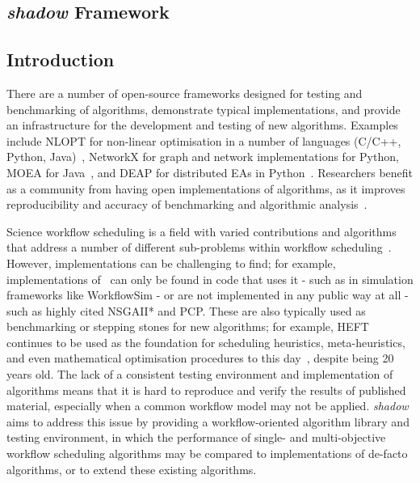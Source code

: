 \documentclass{article}
\begin{document}
\begin{multicols}{2}
\section*{\textit{shadow} Framework}
\label{sec:title}

\subsection*{Introduction}
\label{ssec:subtitle}
There are a number of open-source frameworks designed for testing and benchmarking of algorithms, demonstrate typical implementations, and provide
an infrastructure for the development and testing of new algorithms. Examples include NLOPT for non-linear optimisation in a number of languages (C/C++, Python, Java)~\cite{johnson}, NetworkX for graph and network implementations for Python, MOEA for Java~\cite{2020}, and DEAP for distributed EAs in Python~\cite{derainville2012}. Researchers benefit as a community from having open implementations of algorithms, as it improves reproducibility and accuracy of benchmarking and algorithmic analysis~\cite{crick2014}. 


Science workflow scheduling is a field with varied contributions and algorithms that address a number of different sub-problems
within workflow scheduling~\cite{wu2015a,zotero-661,benoit2013,herroelen1998,rodriguez2016,burkimsher}. However, implementations can be challenging to find; for example, implementations of~\cite{topcuoglu2002} can only be found in code that uses it - such as in simulation frameworks like WorkflowSim - or are not implemented in any public way at all - such as highly cited NSGAII* and PCP. These are also typically used as benchmarking or stepping stones for new algorithms; for example, HEFT continues to be used as the foundation for scheduling heuristics, meta-heuristics, and even mathematical optimisation procedures to this day~\cite{bridi2016}, despite being 20 years old. The lack of a consistent testing environment and implementation of algorithms means that it is hard to reproduce and verify the results of published material, especially when a common workflow model may not be applied. \textit{shadow} aims to address this issue by providing a workflow-oriented algorithm library and testing environment, in which the performance of single- and multi-objective workflow scheduling algorithms may be compared to implementations of de-facto algorithms, or to extend these existing algorithms.    


\end{multicols}
\end{document}
